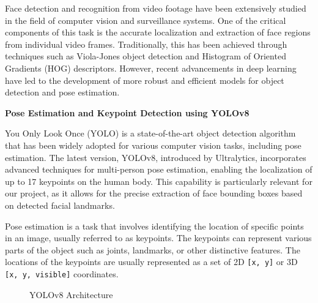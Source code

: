 Face detection and recognition from video footage have been extensively studied in the field of computer vision and surveillance systems. One of the critical components of this task is the accurate localization and extraction of face regions from individual video frames. Traditionally, this has been achieved through techniques such as Viola-Jones object detection and Histogram of Oriented Gradients (HOG) descriptors. However, recent advancements in deep learning have led to the development of more robust and efficient models for object detection and pose estimation.

\textbf{Pose Estimation and Keypoint Detection using YOLOv8}

You Only Look Once (YOLO) is a state-of-the-art object detection algorithm that has been widely adopted for various computer vision tasks, including pose estimation. The latest version, YOLOv8, introduced by Ultralytics, incorporates advanced techniques for multi-person pose estimation, enabling the localization of up to 17 keypoints on the human body. This capability is particularly relevant for our project, as it allows for the precise extraction of face bounding boxes based on detected facial landmarks.

Pose estimation is a task that involves identifying the location of specific points in an image, usually referred to as keypoints. The keypoints can represent various parts of the object such as joints, landmarks, or other distinctive features. The locations of the keypoints are usually represented as a set of 2D \verb|[x, y]| or 3D \verb|[x, y, visible]| coordinates.

\begin{figure}[H]
    \centering
    \caption{YOLOv8 Architecture}
    \label{fig:enter-label}
\end{figure}

